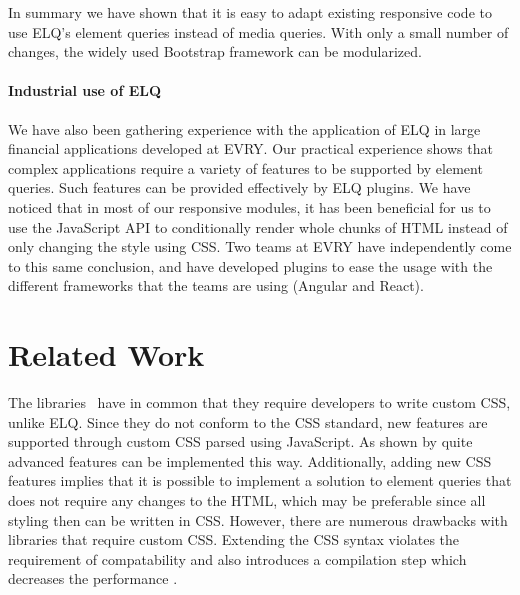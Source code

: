 \documentclass[sigplan,9pt]{acmart}
\newcommand{\elq}{ELQ}
\begin{document}
    In summary we have shown that it is easy to adapt existing responsive code to use \elq{}'s element queries instead of media queries.
    With only a small number of changes, the widely used Bootstrap framework can be modularized.

    \paragraph{Industrial use of \elq{}}
    We have also been gathering experience with the application of
    \elq{} in large financial applications developed at EVRY.
    Our practical experience shows that complex applications
    require a variety of features to be supported by element queries.
    Such features can be provided effectively by \elq{} plugins.
    We have noticed that in most of our responsive modules, it has been beneficial for us to use the JavaScript API
    to conditionally render whole chunks of HTML instead of only changing the style using CSS.
    Two teams at EVRY have independently come to this same conclusion, and have developed plugins to ease the usage with the different frameworks that the teams are using (Angular and React).

\section{Related Work}\label{sec:related}
  The libraries~\cite{eq_imp_magichtml,eq_imp_eqcss,eq_imp_prollyfill-min-width,eq_imp_localised-css,eq_imp_gss} have in common that they require developers to write custom CSS, unlike \elq{}.
  Since they do not conform to the CSS standard, new features are supported through custom CSS parsed using JavaScript.
  As shown by \cite{eq_imp_eqcss,eq_imp_gss} quite advanced features can be implemented this way.
  Additionally, adding new CSS features implies that it is possible to implement a solution to element queries that does not require any changes to the HTML, which may be preferable since all styling then can be written in CSS.
  However, there are numerous drawbacks with libraries that require custom CSS.
  Extending the CSS syntax violates the requirement of compatability and also introduces a compilation step which decreases the performance \cite{elq-thesis}.
\end{document}
